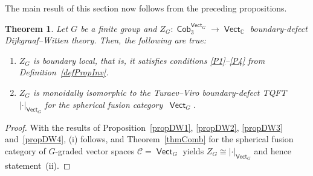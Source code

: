 \documentclass[10pt,a4paper]{amsart}
\DeclareMathOperator{\vect}{\mathsf{Vect}}
\DeclareMathOperator{\C}{\mathbb{C}}
\DeclareMathOperator{\Cob}{\mathsf{Cob}}
\numberwithin{equation}{section}
\newtheorem{Theorem}{Theorem}[section]
\theoremstyle{definition}
\begin{document}
The main result of this section now follows from the preceding propositions.
\begin{Theorem}
 \label{thmDW}
 Let $G$ be a finite group and $Z_G\colon \Cob_3^{\vect_G} \rightarrow \vect_{\C}$ boundary-defect Dijkgraaf--Witten theory. Then, the following are true:
 \begin{enumerate}[$(i)$]\itemsep=0pt
 \item $Z_G$ is boundary local, that is, it satisfies conditions {\rm \ref{P1}--\ref{P4}} from Definition~{\rm \ref{defPropInv}}.
 \item $Z_G$ is monoidally isomorphic to the Turaev--Viro boundary-defect TQFT $|\cdot|_{\vect_G}$ for the spherical fusion category~$\vect_G$.
 \end{enumerate}
\end{Theorem}
\begin{proof}
 With the results of Proposition~\ref{propDW1}, \ref{propDW2}, \ref{propDW3} and~\ref{propDW4}, (i) follows, and Theorem~\ref{thmComb} for the spherical fusion category of $G$-graded vector spaces $\mathcal{C} = \vect_G$ yields $Z_G \cong |\cdot|_{\vect_G}$ and hence statement~(ii).
\end{proof}
\end{document}
